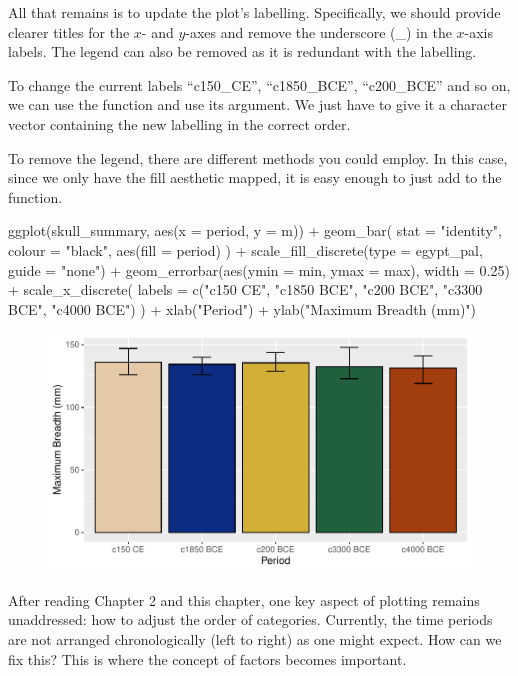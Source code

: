 All that remains is to update the plot’s labelling. Specifically, we should provide clearer titles for the $x$- and $y$-axes and remove the underscore (\_) in the $x$-axis labels. The legend can also be removed as it is redundant with the labelling.

To change the current labels ``c150\_CE'', ``c1850\_BCE'', ``c200\_BCE'' and so on, we can use the function  and use its  argument. We just have to give it a character vector containing the new labelling in the correct order.

To remove the legend, there are different methods you could employ. In this case, since we only have the fill aesthetic mapped, it is easy enough to just add  to the  function.

\begin{inR}
ggplot(skull_summary, aes(x = period, y = m)) +
  geom_bar(
    stat = "identity",
    colour = "black",
    aes(fill = period)
  ) +
  scale_fill_discrete(type = egypt_pal, guide = "none") +
  geom_errorbar(aes(ymin = min, ymax = max), width = 0.25) +
  scale_x_discrete(
    labels = c("c150 CE", "c1850 BCE", "c200 BCE", "c3300 BCE", "c4000 BCE")
  ) +
  xlab("Period") +
  ylab("Maximum Breadth (mm)")
\end{inR}

\vspace{2em}

\begin{figure}[H]
\includegraphics[scale = .75]{graphics/ch3Figs/bar_4.pdf}
\end{figure}

After reading Chapter 2 and this chapter, one key aspect of plotting remains unaddressed: how to adjust the order of categories. Currently, the time periods are not arranged chronologically (left to right) as one might expect. How can we fix this? This is where the concept of factors becomes important.

